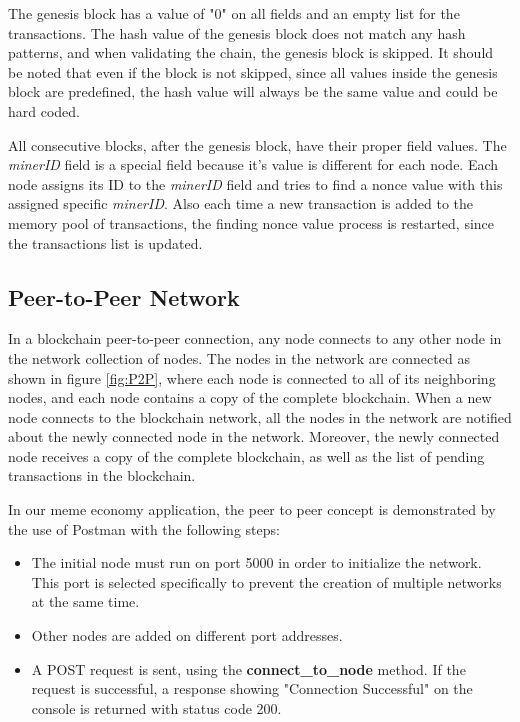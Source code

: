 \documentclass[12pt]{article}
\begin{document}
The genesis block has a value of "0" on all fields and an empty list for the transactions. The hash value of the genesis block does not match any hash patterns, and when validating the chain, the genesis block is skipped. It should be noted that even if the block is not skipped, since all values inside the genesis block are predefined, the hash value will always be the same value and could be hard coded.

All consecutive blocks, after the genesis block, have their proper field values. The \textit{minerID} field is a special field because it's value is different for each node. Each node assigns its ID to the \textit{minerID} field and tries to find a nonce value with this assigned specific \textit{minerID}. Also each time a new transaction is added to the memory pool of transactions, the finding nonce value process is restarted, since the transactions list is updated.


\subsection{Peer-to-Peer Network} %
In a blockchain peer-to-peer connection, any node connects to any other node in the network collection of nodes. The nodes in the network are connected as shown in figure \ref{fig:P2P}, where each node is connected to all of its neighboring nodes, and each node contains a copy of the complete blockchain. When a new node connects to the blockchain network, all the nodes in the network are notified about the newly connected node in the network. Moreover, the newly connected node receives a copy of the complete blockchain, as well as the list of pending transactions in the blockchain. 

In our meme economy application, the peer to peer concept is demonstrated by the use of Postman with the following steps:
\begin{itemize}
    \item The initial node must run on port 5000 in order to initialize the network. This port is selected specifically to prevent the creation of multiple networks at the same time.
    \item Other nodes are added on different port addresses.
    \item A POST request is sent, using the \textbf{connect\_to\_node} method. If the request is successful, a response showing "Connection Successful" on the console is returned with status code 200.
\end{itemize}
\end{document}
